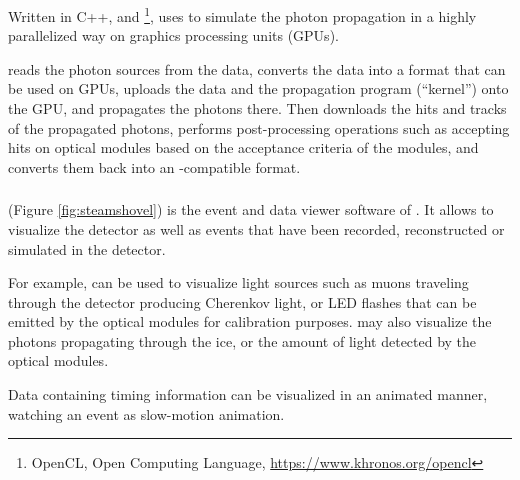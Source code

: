 Written in C++,  and \footnote{OpenCL, Open Computing Language, \url{https://www.khronos.org/opencl}}, \clsim uses  to simulate the photon propagation in a highly parallelized way on graphics processing units (GPUs).

\clsim reads the photon sources from the \icesim data, converts the data into a format that can be used on GPUs, uploads the data and the propagation program (``kernel'') onto the GPU, and propagates the photons there. Then \clsim downloads the hits and tracks of the propagated photons, performs post-processing operations such as accepting hits on optical modules based on the acceptance criteria of the modules, and converts them back into an \icesim-compatible format.





\subsubsection{\steamshovel}

\steamshovel (Figure \ref{fig:steamshovel}) is the event and data viewer software of \icecube. It allows to visualize the \icecube detector as well as events that have been recorded, reconstructed or simulated in the detector.

For example, \steamshovel can be used to visualize light sources such as muons traveling through the detector producing Cherenkov light, or LED flashes that can be emitted by the optical modules for calibration purposes. \steamshovel may also visualize the photons propagating through the ice, or the amount of light detected by the optical modules.

Data containing timing information can be visualized in an animated manner, watching an event as slow-motion animation.

